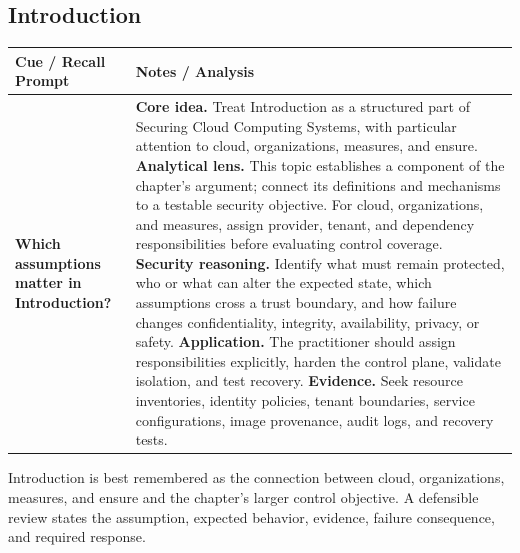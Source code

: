 \documentclass[11pt]{article}
\newcommand{\CornellHeader}{%
\rowcolor{Navy}\color{white}\bfseries Cue / Recall Prompt & \color{white}\bfseries Notes / Analysis\\\hline}
\newcommand{\CornellRow}[2]{%
\cellcolor{CueGray}\RaggedRight\textbf{#1} & \RaggedRight #2\\\hline}
\begin{document}
\subsection*{Introduction}
\begin{longtable}{>{\RaggedRight\arraybackslash}p{}|>{\RaggedRight\arraybackslash}p{}}
\CornellHeader
\CornellRow{Which assumptions matter in Introduction?}{\textbf{Core idea.} Treat Introduction as a structured part of Securing Cloud Computing Systems, with particular attention to cloud, organizations, measures, and ensure. \textbf{Analytical lens.} This topic establishes a component of the chapter's argument; connect its definitions and mechanisms to a testable security objective. For cloud, organizations, and measures, assign provider, tenant, and dependency responsibilities before evaluating control coverage. \textbf{Security reasoning.} Identify what must remain protected, who or what can alter the expected state, which assumptions cross a trust boundary, and how failure changes confidentiality, integrity, availability, privacy, or safety. \textbf{Application.} The practitioner should assign responsibilities explicitly, harden the control plane, validate isolation, and test recovery. \textbf{Evidence.} Seek resource inventories, identity policies, tenant boundaries, service configurations, image provenance, audit logs, and recovery tests.}
\end{longtable}
\begin{topicsummary}
Introduction is best remembered as the connection between cloud, organizations, measures, and ensure and the chapter's larger control objective. A defensible review states the assumption, expected behavior, evidence, failure consequence, and required response.
\end{topicsummary}
\end{document}
